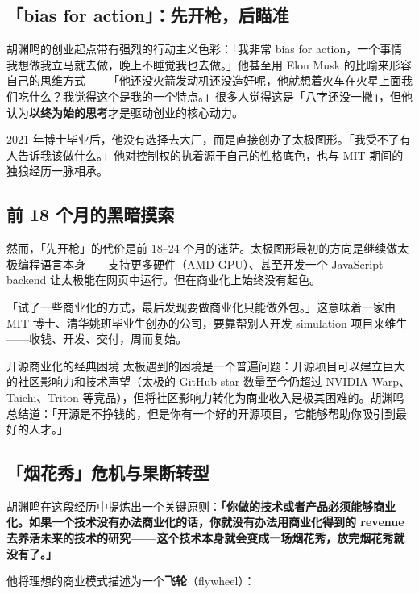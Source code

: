 \documentclass[a4paper]{article}
\begin{document}
\subsection{「bias for action」：先开枪，后瞄准}

胡渊鸣的创业起点带有强烈的行动主义色彩：「我非常 bias for action，一个事情我想做我立马就去做，晚上不睡觉我也去做。」他甚至用 Elon Musk 的比喻来形容自己的思维方式——「他还没火箭发动机还没造好呢，他就想着火车在火星上面我们吃什么？我觉得这个是我的一个特点。」很多人觉得这是「八字还没一撇」，但他认为\textbf{以终为始的思考}才是驱动创业的核心动力。

2021 年博士毕业后，他没有选择去大厂，而是直接创办了太极图形。「我受不了有人告诉我该做什么。」他对控制权的执着源于自己的性格底色，也与 MIT 期间的独狼经历一脉相承。

\subsection{前 18 个月的黑暗摸索}

然而，「先开枪」的代价是前 18--24 个月的迷茫。太极图形最初的方向是继续做太极编程语言本身——支持更多硬件（AMD GPU）、甚至开发一个 JavaScript backend 让太极能在网页中运行。但在商业化上始终没有起色。

「试了一些商业化的方式，最后发现要做商业化只能做外包。」这意味着一家由 MIT 博士、清华姚班毕业生创办的公司，要靠帮别人开发 simulation 项目来维生——收钱、开发、交付，周而复始。

\begin{warningbox}{开源商业化的经典困境}
太极遇到的困境是一个普遍问题：开源项目可以建立巨大的社区影响力和技术声望（太极的 GitHub star 数量至今仍超过 NVIDIA Warp、Taichi、Triton 等竞品），但将社区影响力转化为商业收入是极其困难的。胡渊鸣总结道：「开源是不挣钱的，但是你有一个好的开源项目，它能够帮助你吸引到最好的人才。」
\end{warningbox}

\subsection{「烟花秀」危机与果断转型}

胡渊鸣在这段经历中提炼出一个关键原则：\textbf{「你做的技术或者产品必须能够商业化。如果一个技术没有办法商业化的话，你就没有办法用商业化得到的 revenue 去养活未来的技术的研究——这个技术本身就会变成一场烟花秀，放完烟花秀就没有了。」}

他将理想的商业模式描述为一个\textbf{飞轮}（flywheel）：
\end{document}
